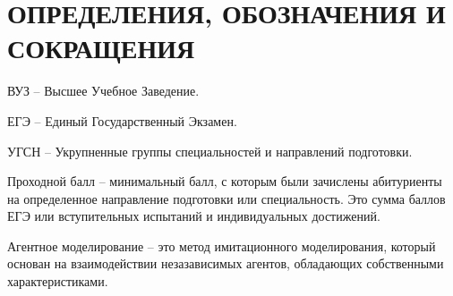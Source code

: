 \section*{ОПРЕДЕЛЕНИЯ, ОБОЗНАЧЕНИЯ И СОКРАЩЕНИЯ}

ВУЗ – Высшее Учебное Заведение.

ЕГЭ – Единый Государственный Экзамен.

УГСН – Укрупненные группы специальностей и направлений подготовки.

Проходной балл – минимальный балл, с которым были зачислены абитуриенты на определенное направление подготовки или специальность. Это сумма баллов ЕГЭ или вступительных испытаний и индивидуальных достижений.

Агентное моделирование – это метод имитационного моделирования, который основан на взаимодействии незазависимых агентов, 
обладающих собственными характеристиками.

\pagebreak